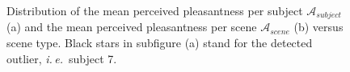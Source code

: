 \documentclass[12pt]{elsarticle}
\newcommand{\ie}{\emph{i.\,e.}}
\newcommand{\cf}{cf.}
\newcommand{\myfloatalign}{\centering}
\begin{document}
\begin{figure}[t]
        \myfloatalign
        \caption{Distribution of the mean perceived pleasantness per subject $\mathcal{A}_{subject}$ (a) and the mean perceived pleasantness per scene $\mathcal{A}_{scene}$ (b) versus scene type. Black stars in subfigure (a) stand for the detected outlier, \ie~subject 7.}\label{fig:xp2A}
\end{figure}


\end{document}
